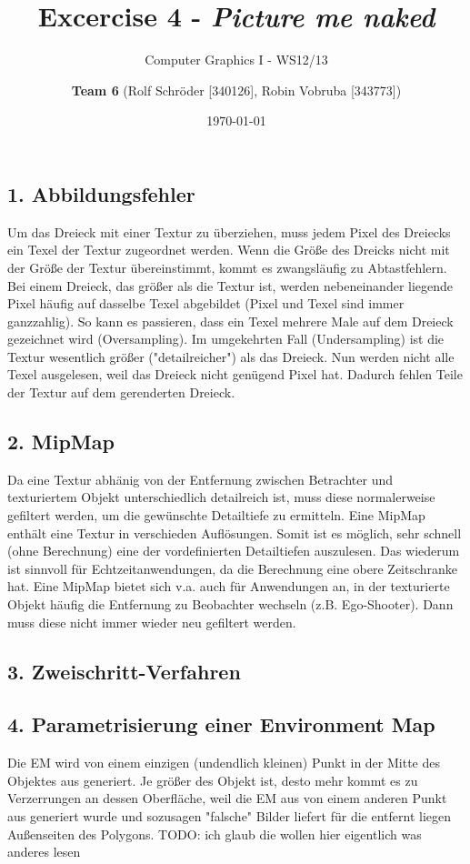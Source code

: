 \documentclass[a4paper,headings=small]{scrartcl}
\title{Excercise 4 - \emph{Picture me naked}}
\subtitle{Computer Graphics I - WS12/13}
\author{\textbf{Team 6} (Rolf Schröder [340126], Robin Vobruba [343773])}
\date{\today}
\numberwithin{equation}{section} %
\numberwithin{figure}{section}   %
\begin{document}
\maketitle

\subsection*{1. Abbildungsfehler}
Um das Dreieck mit einer Textur zu überziehen, muss jedem Pixel des Dreiecks ein Texel der Textur zugeordnet werden.
Wenn die Größe des Dreicks nicht mit der Größe der Textur übereinstimmt, kommt es zwangsläufig zu Abtastfehlern.
Bei einem Dreieck, das größer als die Textur ist, werden nebeneinander liegende Pixel häufig auf dasselbe Texel abgebildet (Pixel und Texel sind immer ganzzahlig).
So kann es passieren, dass ein Texel mehrere Male auf dem Dreieck gezeichnet wird (Oversampling).
Im umgekehrten Fall (Undersampling) ist die Textur wesentlich größer ("detailreicher") als das Dreieck.
Nun werden nicht alle Texel ausgelesen, weil das Dreieck nicht genügend Pixel hat.
Dadurch fehlen Teile der Textur auf dem gerenderten Dreieck.

\subsection*{2. MipMap}
Da eine Textur abhänig von der Entfernung zwischen Betrachter und texturiertem Objekt unterschiedlich detailreich ist, muss diese normalerweise gefiltert werden, um die gewünschte Detailtiefe zu ermitteln.
Eine MipMap enthält eine Textur in verschieden Auflösungen.
Somit ist es möglich, sehr schnell (ohne Berechnung) eine der vordefinierten Detailtiefen auszulesen.
Das wiederum ist sinnvoll für Echtzeitanwendungen, da die Berechnung eine obere Zeitschranke hat.
Eine MipMap bietet sich v.a. auch für Anwendungen an, in der texturierte Objekt häufig die Entfernung zu Beobachter wechseln (z.B. Ego-Shooter).
Dann muss diese nicht immer wieder neu gefiltert werden.

\subsection*{3. Zweischritt-Verfahren}

\subsection*{4. Parametrisierung einer Environment Map}
Die EM wird von einem einzigen (undendlich kleinen) Punkt in der Mitte des Objektes aus generiert.
Je größer des Objekt ist, desto mehr kommt es zu Verzerrungen an dessen Oberfläche, weil die EM aus von einem anderen Punkt aus generiert wurde und sozusagen "falsche" Bilder liefert für die entfernt liegen Außenseiten des Polygons.
TODO: ich glaub die wollen hier eigentlich was anderes lesen
\end{document}
